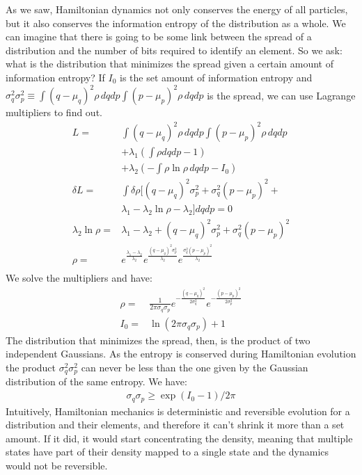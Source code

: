 \documentclass[11pt]{article}
\begin{document}
As we saw, Hamiltonian dynamics not only conserves the energy of all particles, but it also conserves the information entropy of the distribution as a whole. We can imagine that there is going to be some link between the spread of a distribution and the number of bits required to identify an element. So we ask: what is the distribution that minimizes the spread given a certain amount of information entropy? If $I_0$ is the set amount of information entropy and $\sigma_q^2 \sigma_p^2 \equiv \int (q-\mu_q)^2 \rho \, dqdp \int (p-\mu_p)^2 \rho \, dqdp$ is the spread, we can use Lagrange multipliers to find out.
\begin{align*}
L = &\int (q-\mu_q)^2 \rho \, dqdp \int (p-\mu_p)^2 \rho \, dqdp \\
&+ \lambda_1(\int \rho dqdp - 1) \\ &+ \lambda_2(- \int \rho \ln \rho \, dqdp - I_0)\\ 
\delta L = &\int \delta \rho [(q-\mu_q)^2 \sigma_p^2 + \sigma_q^2 (p-\mu_p)^2 + \\ &\lambda_1 - \lambda_2 \ln \rho - \lambda_2 ] dqdp = 0 \\
\lambda_2 \ln \rho = &\lambda_1 - \lambda_2 + (q-\mu_q)^2 \sigma_p^2 + \sigma_q^2 (p-\mu_p)^2 \\
\rho = &e^{\frac{\lambda_1 - \lambda_2}{\lambda_2}}e^{\frac{(q-\mu_q)^2 \sigma_p^2}{\lambda_2}}e^{\frac{\sigma_q^2 (p-\mu_p)^2}{\lambda_2}}\\
\end{align*}
We solve the multipliers and have:
\begin{align*}
\rho = &\frac{1}{ 2 \pi \sigma_q \sigma_p} e^{-\frac{(q-\mu_q)^2}{2\sigma_q^2}} e^{-\frac{(p-\mu_p)^2}{2\sigma_p^2}} \\
I_0 = &\ln (2\pi\sigma_q\sigma_p) + 1
\end{align*}
The distribution that minimizes the spread, then, is the product of two independent Gaussians. As the entropy is conserved during Hamiltonian evolution the product $\sigma_q^2 \sigma_p^2$ can never be less than the one given by the Gaussian distribution of the same entropy. We have:
\begin{align*}
\sigma_q\sigma_p \geq \exp (I_0 - 1) / 2 \pi 
\end{align*}
Intuitively, Hamiltonian mechanics is deterministic and reversible evolution for a distribution and their elements, and therefore it can't shrink it more than a set amount. If it did, it would start concentrating the density, meaning that multiple states have part of their density mapped to a single state and the dynamics would not be reversible.
\end{document}
